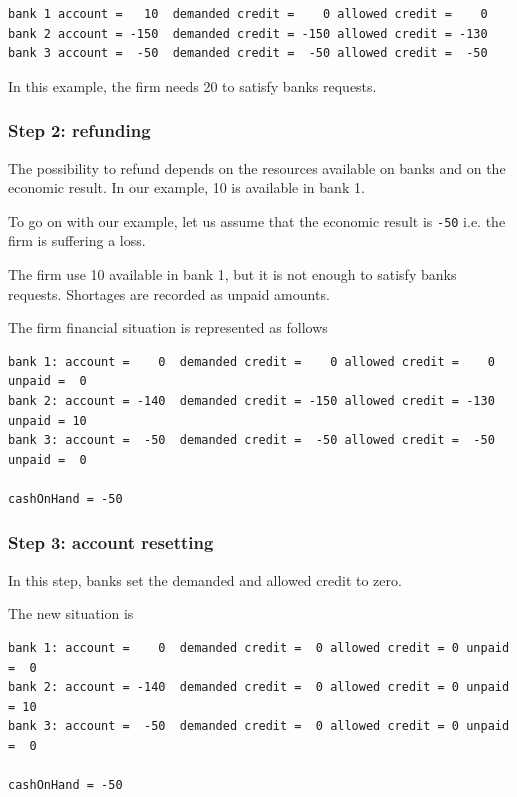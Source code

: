 \documentclass{book}
\begin{document}
\begin{verbatim}
bank 1 account =   10  demanded credit =    0 allowed credit =    0
bank 2 account = -150  demanded credit = -150 allowed credit = -130 
bank 3 account =  -50  demanded credit =  -50 allowed credit =  -50
\end{verbatim}

In this example, the firm needs 20 to satisfy banks requests.

\subsubsection*{Step 2: refunding}

The possibility to refund depends on the resources available on banks and on the economic result. In our example, 10 is available in bank 1.

To go on with our example, let us assume that the economic result is \verb+-50+ i.e. the firm is suffering a loss.

The firm use 10 available in bank 1, but it is not enough to satisfy banks requests. Shortages are recorded as unpaid amounts.

The firm financial situation is represented as follows

\begin{verbatim}
bank 1: account =    0  demanded credit =    0 allowed credit =    0 unpaid =  0
bank 2: account = -140  demanded credit = -150 allowed credit = -130 unpaid = 10
bank 3: account =  -50  demanded credit =  -50 allowed credit =  -50 unpaid =  0

cashOnHand = -50
\end{verbatim}

\subsubsection*{Step 3: account resetting}
In this step, banks set the demanded and allowed credit to zero.

The new situation is

\begin{verbatim}
bank 1: account =    0  demanded credit =  0 allowed credit = 0 unpaid =  0
bank 2: account = -140  demanded credit =  0 allowed credit = 0 unpaid = 10
bank 3: account =  -50  demanded credit =  0 allowed credit = 0 unpaid =  0

cashOnHand = -50
\end{verbatim}
\end{document}
